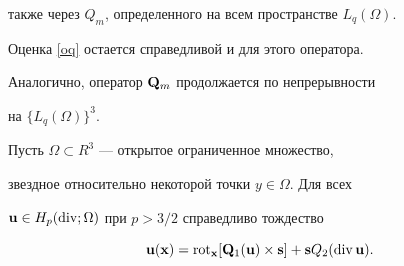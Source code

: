 также через $Q_m$, определенного на всем пространстве $L_q(\Omega)$.


Оценка \eqref{oq} остается справедливой и для этого оператора.





Аналогично, оператор $\bold{Q}_m$ продолжается по непрерывности


на $\{L_q(\Omega)\}^3$.





\begin{thms} \label{n1}


Пусть $\Omega\subset R^3$ --- открытое ограниченное множество, 


звездное относительно некоторой точки $y\in\Omega$. Для всех


$\bold{u}\in H_p(\operatorname{div};\Omega)$ при ${p>3/2}$ справедливо тождество


\begin{equation}


\bold{u}(\bold{x})=


\Rot_{\bold{x}}[\bold{Q}_1(\bold{u})\times\bold{s}]+\bold{s}Q_2(\Div\bold{u}).


\label{nn1}


\end{equation}


\end{thms}





